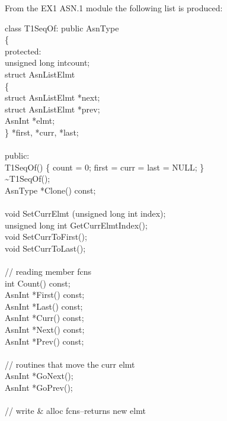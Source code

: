 From the EX1 ASN.1 module the following list is produced:
\begin{Ccode}
class T1SeqOf: public AsnType\\
\{\\
protected:\+\\
    unsigned long int\>\>count;\\
    struct AsnListElmt\\
    \{\+\\
        struct AsnListElmt \>*next;\\
        struct AsnListElmt \>*prev;\\
        AsnInt             \>*elmt;\-\\
    \}                   \>\>*first, *curr, *last;\\
\\
\<public:\\
                         \>\>T1SeqOf() \{ count = 0; first = curr = last = NULL; \}\\
                         \>\>\~{}T1SeqOf();\\
    AsnType              \>\>*Clone() const;\\
\\
    void                 \>\>SetCurrElmt (unsigned long int index);\\
    unsigned long int    \>\>GetCurrElmtIndex();\\
    void                 \>\>SetCurrToFirst();\\
    void                 \>\>SetCurrToLast();\\
\\
    // reading member fcns\\
    int                  \>\>Count() const;\\
    AsnInt               \>\>*First() const;\\
    AsnInt               \>\>*Last() const;\\
    AsnInt               \>\>*Curr() const;\\
    AsnInt               \>\>*Next() const;\\
    AsnInt               \>\>*Prev() const;\\
\\
    // routines that move the curr elmt\\
    AsnInt               \>\>*GoNext();\\
    AsnInt               \>\>*GoPrev();\\
\\
    // write \& alloc fcns--returns new elmt\\

\end{Ccode}
